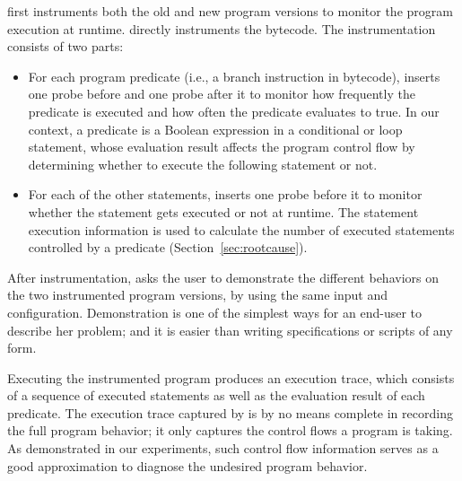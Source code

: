 \ourtool first instruments both the old and new program versions
to monitor the program  execution at runtime. \ourtool directly
instruments the bytecode. The instrumentation
consists of two parts:

\vspace{-2mm}

\begin{itemize}
\item For each program predicate (i.e., a branch instruction
in bytecode), \ourtool inserts one
probe before and one probe after it
to monitor how frequently the predicate is executed and
how often the predicate evaluates to true. In our
context, a predicate is a Boolean expression in a
conditional or loop statement,
whose evaluation result affects the program
control flow by determining whether to execute the
following statement or not.


\item For each of the other statements, \ourtool inserts
one probe before it to monitor whether the statement
gets executed or not at runtime. The statement execution
information is used to calculate the number of executed
statements controlled by a predicate (Section~\ref{sec:rootcause}).



\end{itemize}


\vspace{-1mm}

After instrumentation, \ourtool asks the user to demonstrate the different
behaviors on the two instrumented program versions, by using
the same input and configuration. Demonstration is
one of the simplest ways for an end-user to describe her problem;
and it is easier than writing specifications or scripts of any form.

Executing the instrumented program produces an execution trace,
which consists of a sequence of executed statements as well
as the evaluation result of each predicate.
The execution trace captured by \ourtool is by no means complete
in recording the full program behavior; it only
captures the control flows a program is taking. As demonstrated
in our experiments, such control flow information serves as a
good approximation to diagnose the undesired program behavior.

